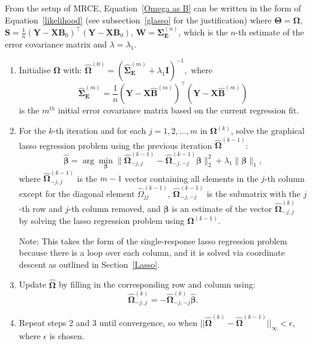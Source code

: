 From the setup of MRCE, Equation~\ref{Omega as B} can be written in the form of  Equation~\ref{likelihood} (see subsection~\ref{glasso} for the justification) where $\boldsymbol{\Theta} = \mathbf{\Omega}$, $\mathbf{S} = \frac{1}{n} (\mathbf{Y} - \mathbf{X} \mathbf{B}_0)^\top (\mathbf{Y} - \mathbf{X} \mathbf{B}_0)$, $\mathbf{W} = \mathbf{\Sigma}^{({n})}_\mathbf{E}$, which is the $n$-th estimate of the error covariance matrix and $\lambda=\lambda_1$. 

\begin{enumerate}
    \item Initialise \( \mathbf{\Omega} \) with:
    $
    \hat{\mathbf{\Omega}}^{(0)} = (\hat{\mathbf{\Sigma}}^{(m)}_{\mathbf{E}} + \lambda_1 \mathbf{I})^{-1},
    $
    where 
    \[
     \hat{\mathbf{\Sigma}}^{(m)}_{\mathbf{E}} = \frac{1}{n} (\mathbf{Y} - \mathbf{X} \mathbf{\hat{B}}^{(m)})^\top (\mathbf{Y} - \mathbf{X} \mathbf{\hat{B}}^{(m)})
    \]
    is the $m^{th}$ initial error covariance matrix based on the current regression fit.

    \item For the $k$-th iteration and for each \( j = 1, 2, \dots, m \) in $\mathbf{\Omega}^{(k)}$, solve the graphical lasso regression problem using the previous iteration \( \hat{\mathbf{\Omega}}^{(k-1)} \):
    \[
    \hat{\boldsymbol{\beta}} = \arg\min_{\boldsymbol{\beta}} \|\hat{\mathbf{\Omega}}^{(k-1)}_{-j,j} - \hat{\mathbf{\Omega}}^{(k-1)}_{-j,-j} \boldsymbol{\beta} \|_2^2 + \lambda_1 \|\boldsymbol{\beta} \|_1,
    \]
    where \( \hat{\mathbf{\Omega}}_{-j,j}^{(k-1)} \) is the \( m - 1 \) vector containing all elements in the \( j \)-th column except for the diagonal element \( \hat{\Omega}_{jj}^{(k-1)} \), \( \hat{\mathbf{\Omega}}_{-j,-j}^{(k-1)} \) is the submatrix with the $j$-th row and $j$-th column removed, and $\boldsymbol{\beta}$ is an estimate of the vector $\hat{\mathbf{\Omega}}_{-j,j}^{(k)}$ by solving the lasso regression problem using \( \mathbf{\Omega}^{(k-1)} \).

    Note: This takes the form of the single-response lasso regression problem because there is a loop over each column, and it is solved via coordinate descent as outlined in Section~\ref{Lasso}. %

    \item Update \( \hat{\mathbf{\Omega}} \) by filling in the corresponding row and column using:
    \[
    \hat{\mathbf{\Omega}}^{(k)}_{-j,j} = -\hat{\mathbf{\Omega}}^{(k)}_{-j,-j} \hat{\boldsymbol{\beta}}.
    \]

    \item Repeat steps 2 and 3 until convergence, so when $||\hat{\mathbf{\Omega}}^{(k)} - \hat{\mathbf{\Omega}}^{(k-1)}||_\infty < \epsilon$, where $\epsilon$ is chosen.
\end{enumerate}


